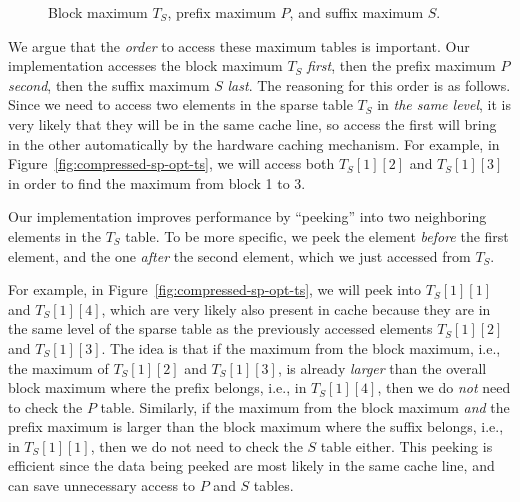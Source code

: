 

\begin{figure}[!thb]
  \centering {}  \caption{Block maximum $T_S$, prefix maximum $P$, and suffix maximum $S$.}
  \label{fig:compressed-sp-opt}
\end{figure}

We argue that the {\em order} to access these maximum tables is
important.  Our implementation accesses the block maximum $T_S$ {\em
first}, then the prefix maximum $P$ {\em second}, then the suffix
maximum $S$ {\em last}.  The reasoning for this order is as follows.
Since we need to access two elements in the sparse table $T_S$ in {\em
the same level}, it is very likely that they will be in the same cache
line, so access the first will bring in the other automatically by the
hardware caching mechanism.  For example, in
Figure~\ref{fig:compressed-sp-opt-ts}, we will access both $T_{S}[1][2]$
and $T_{S}[1][3]$ in order to find the maximum from block 1 to 3.

Our implementation improves performance by ``peeking'' into two
neighboring elements in the $T_{S}$ table.  To be more specific, we
peek the element {\em before} the first element, and the one {\em
  after} the second element, which we just accessed from $T_S$.

For example, in Figure~\ref{fig:compressed-sp-opt-ts}, we will peek into
$T_{S}[1][1]$ and $T_{S}[1][4]$, which are very likely also present in
cache because they are in the same level of the sparse table as the
previously accessed elements $T_{S}[1][2]$ and $T_{S}[1][3]$.  The idea
is that if the maximum from the block maximum, i.e., the maximum of
$T_{S}[1][2]$ and $T_{S}[1][3]$, is already {\em larger} than the
overall block maximum where the prefix belongs, i.e., in
$T_{S}[1][4]$, then we do {\em not} need to check the $P$ table.
Similarly, if the maximum from the block maximum {\em and} the prefix
maximum is larger than the block maximum where the suffix belongs,
i.e., in $T_{S}[1][1]$, then we do not need to check the $S$ table
either.  This peeking is efficient since the data being peeked are
most likely in the same cache line, and can save unnecessary access to
$P$ and $S$ tables.

